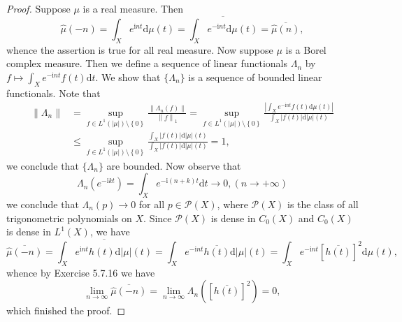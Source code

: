 \begin{proof}
Suppose $\mu$ is a real measure. Then 
$$
\widehat{\mu }\left( -n \right) =\int_X{e^{\mathrm{i}nt}\mathrm{d}\mu \left( t \right)}=\overline{\int_X{e^{-\mathrm{i}nt}\mathrm{d}\mu \left( t \right)}}=\overline{\widehat{\mu }\left( n \right) },
$$
whence the assertion is true for all real measure. Now suppose $\mu$ is a Borel complex measure. Then we define a sequence of linear functionals $\Lambda_n$ by $f\mapsto\int_Xe^{-\mathrm{i}nt}f(t)\mathrm{d}t$. We show that $\{\Lambda_n\}$ is a sequence of bounded linear functionals. Note that 
$$
\begin{aligned}
\left\| \Lambda _n \right\| &=\mathop {\mathrm{sup}} \limits_{f\in L^1\left( \left| \mu \right| \right) \setminus \left\{ 0 \right\}}\frac{\left\| \Lambda _n\left( f \right) \right\|}{\left\| f \right\| _1}=\mathop {\mathrm{sup}} \limits_{f\in L^1\left( \left| \mu \right| \right) \setminus \left\{ 0 \right\}}\frac{\left| \int_X{e^{-\mathrm{i}nt}f\left( t \right) \mathrm{d}\mu \left( t \right)} \right|}{\int_X{\left| f\left( t \right) \right|\mathrm{d}\left| \mu \right|\left( t \right)}}
\\
&\le \mathop {\mathrm{sup}} \limits_{f\in L^1\left( \left| \mu \right| \right) \setminus \left\{ 0 \right\}}\frac{\int_X{\left| f\left( t \right) \right|\mathrm{d}\left| \mu \right|\left( t \right)}}{\int_X{\left| f\left( t \right) \right|\mathrm{d}\left| \mu \right|\left( t \right)}}=1,
\end{aligned}
$$
we conclude that $\{\Lambda_n\}$ are bounded. Now observe that 
$$
\Lambda _n\left( e^{-\mathrm{i}kt} \right) =\int_X{e^{-\mathrm{i}\left( n+k \right) t}\mathrm{d}t}\rightarrow 0,\left( n\rightarrow +\infty \right) 
$$
we conclude that $\Lambda_n(p)\to 0$ for all $p\in\mathcal{P}(X)$, where $\mathcal{P}(X)$ is the class of all trigonometric polynomials on $X$. Since $\mathcal{P}(X)$ is dense in $C_0(X)$ and $C_0(X)$ is dense in $L^1(X)$, we have 
$$
\overline{\widehat{\mu }\left( -n \right) }=\overline{\int_X{e^{\mathrm{i}nt}h\left( t \right) \mathrm{d}\left| \mu \right|\left( t \right)}}=\int_X{e^{-\mathrm{i}nt}\overline{h\left( t \right) }\mathrm{d}\left| \mu \right|\left( t \right)}=\int_X{e^{-\mathrm{i}nt}\left[ \overline{h\left( t \right) } \right] ^2\mathrm{d}\mu \left( t \right)},
$$
whence by Exercise 5.7.16 we have 
$$
\lim_{n\rightarrow \infty} \overline{\widehat{\mu }\left( -n \right) }=\lim_{n\rightarrow \infty} \Lambda _n\left( \left[ \overline{h\left( t \right) } \right] ^2 \right) =0,
$$
which finished the proof.
\end{proof}
